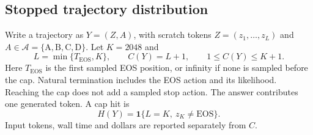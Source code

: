 \documentclass[11pt]{article}
\begin{document}
\subsection{Stopped trajectory distribution}

Write a trajectory as $Y=(Z,A)$, with scratch tokens $Z=(z_1,\ldots,z_L)$ and $A\in\mathcal A=\{\mathrm A,\mathrm B,\mathrm C,\mathrm D\}$. Let $K=2048$ and
\begin{equation}
 L=\min\{T_{\mathrm{EOS}},K\},\qquad C(Y)=L+1,
 \qquad 1\leq C(Y)\leq K+1.
\end{equation}
Here $T_{\mathrm{EOS}}$ is the first sampled EOS position, or infinity if none is sampled before the cap. Natural termination includes the EOS action and its likelihood. Reaching the cap does not add a sampled stop action. The answer contributes one generated token. A cap hit is
\begin{equation}
 H(Y)=\mathbf1\{L=K,\ z_K\ne\mathrm{EOS}\}.
\end{equation}
Input tokens, wall time and dollars are reported separately from $C$.
\end{document}
